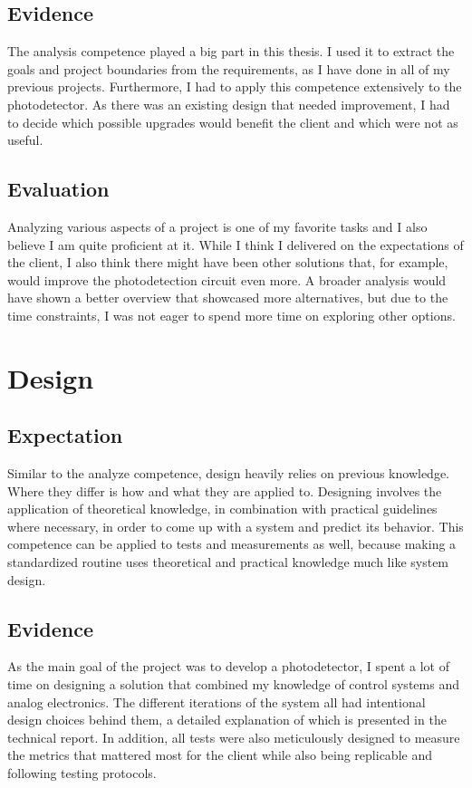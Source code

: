 \documentclass{report}
\begin{document}
\subsection{Evidence}
The analysis competence played a big part in this thesis. I used it to extract the goals and project boundaries from the requirements, as I have done in all of my previous projects. Furthermore, I had to apply this competence extensively to the photodetector. As there was an existing design that needed improvement, I had to decide which possible upgrades would benefit the client and which were not as useful.

\subsection{Evaluation}
Analyzing various aspects of a project is one of my favorite tasks and I also believe I am quite proficient at it. While I think I delivered on the expectations of the client, I also think there might have been other solutions that, for example, would improve the photodetection circuit even more. A broader analysis would have shown a better overview that showcased more alternatives, but due to the time constraints, I was not eager to spend more time on exploring other options.

\section{Design} \label{chap:design}%
\subsection{Expectation}
Similar to the analyze competence, design heavily relies on previous knowledge. Where they differ is how and what they are applied to. Designing involves the application of theoretical knowledge, in combination with practical guidelines where necessary, in order to come up with a system and predict its behavior. This competence can be applied to tests and measurements as well, because making a standardized routine uses theoretical and practical knowledge much like system design.

\subsection{Evidence}
As the main goal of the project was to develop a photodetector, I spent a lot of time on designing a solution that combined my knowledge of control systems and analog electronics. The different iterations of the system all had intentional design choices behind them, a detailed explanation of which is presented in the technical report. In addition, all tests were also meticulously designed to measure the metrics that mattered most for the client while also being replicable and following testing protocols.
\end{document}
